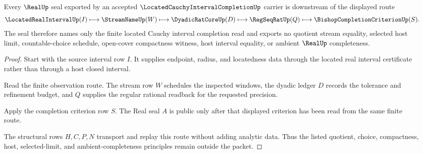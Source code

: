 \begin{theorem}
\label{thm:located-cauchy-interval-completion-real-seal-nonescape}
Every $\RealUp$ seal exported by an accepted $\LocatedCauchyIntervalCompletionUp$ carrier is downstream of the displayed route
$$
\LocatedRealIntervalUp(I)\longmapsto \StreamNameUp(W)\longmapsto \DyadicRatCoreUp(D)\longmapsto \RegSeqRatUp(Q)\longmapsto \BishopCompletionCriterionUp(S).
$$
The seal therefore names only the finite located Cauchy interval completion read and exports no quotient stream equality, selected host limit, countable-choice schedule, open-cover compactness witness, host interval equality, or ambient $\RealUp$ completeness.
\end{theorem}
\begin{proof}
Start with the source interval row $I$. It supplies endpoint, radius, and locatedness data through the located real interval certificate rather than through a host closed interval.

Read the finite observation route. The stream row $W$ schedules the inspected windows, the dyadic ledger $D$ records the tolerance and refinement budget, and $Q$ supplies the regular rational readback for the requested precision.

Apply the completion criterion row $S$. The Real seal $A$ is public only after that displayed criterion has been read from the same finite route.

The structural rows $H,C,P,N$ transport and replay this route without adding analytic data. Thus the listed quotient, choice, compactness, host, selected-limit, and ambient-completeness principles remain outside the packet.
\end{proof}

